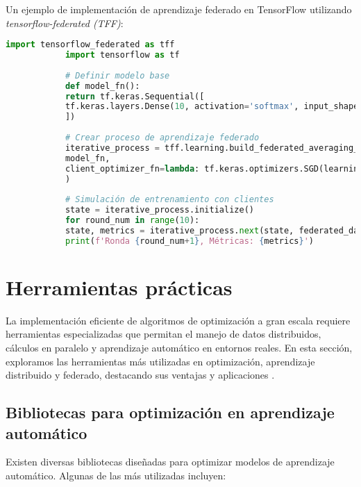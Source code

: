\begin{itemize}
		Un ejemplo de implementación de aprendizaje federado en TensorFlow utilizando \textit{tensorflow-federated (TFF)}:
		
		\begin{lstlisting}[language=Python, caption={Entrenamiento federado en TensorFlow}]
			import tensorflow_federated as tff
			import tensorflow as tf
			
			# Definir modelo base
			def model_fn():
			return tf.keras.Sequential([
			tf.keras.layers.Dense(10, activation='softmax', input_shape=(28, 28))
			])
			
			# Crear proceso de aprendizaje federado
			iterative_process = tff.learning.build_federated_averaging_process(
			model_fn,
			client_optimizer_fn=lambda: tf.keras.optimizers.SGD(learning_rate=0.01)
			)
			
			# Simulación de entrenamiento con clientes
			state = iterative_process.initialize()
			for round_num in range(10):
			state, metrics = iterative_process.next(state, federated_data)
			print(f'Ronda {round_num+1}, Métricas: {metrics}')
		\end{lstlisting}
		
		\section{Herramientas prácticas}
		
		La implementación eficiente de algoritmos de optimización a gran escala requiere herramientas especializadas que permitan el manejo de datos distribuidos, cálculos en paralelo y aprendizaje automático en entornos reales. En esta sección, exploramos las herramientas más utilizadas en optimización, aprendizaje distribuido y federado, destacando sus ventajas y aplicaciones \cite{abadi2016tensorflow}.
		
		\subsection{Bibliotecas para optimización en aprendizaje automático}
		
		Existen diversas bibliotecas diseñadas para optimizar modelos de aprendizaje automático. Algunas de las más utilizadas incluyen:
		

\end{itemize}

